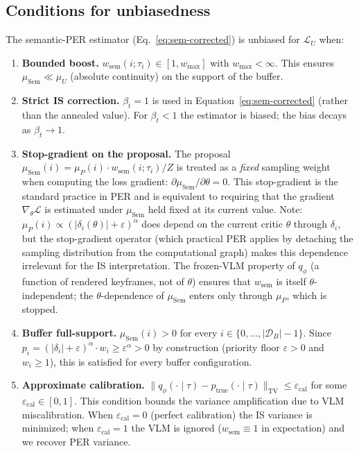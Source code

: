 \subsection{Conditions for unbiasedness}
\label{app:unbiased}

The semantic-PER estimator (Eq.~\ref{eq:sem-corrected}) is unbiased for
$\mathcal{L}_U$ when:

\begin{enumerate}\itemsep1pt
\item[(A1)] \textbf{Bounded boost.} $w_{\text{sem}}(i;\tau_i)\in[1,w_{\max}]$
with $w_{\max}<\infty$. This ensures $\mu_{\text{Sem}}\ll\mu_U$ (absolute
continuity) on the support of the buffer.
\item[(A2)] \textbf{Strict IS correction.} $\beta_t=1$ is used in
Equation~\eqref{eq:sem-corrected} (rather than the annealed value). For
$\beta_t<1$ the estimator is biased; the bias decays as $\beta_t\to 1$.
\item[(A3)] \textbf{Stop-gradient on the proposal.} The proposal
$\mu_{\text{Sem}}(i)=\mu_P(i)\cdot w_{\text{sem}}(i;\tau_i)/Z$ is
treated as a \emph{fixed} sampling weight when computing the loss gradient:
$\partial\mu_{\text{Sem}}/\partial\theta=0$. This stop-gradient
is the standard practice in PER \citep{schaul2016per} and is equivalent
to requiring that the gradient $\nabla_\theta\mathcal{L}$ is estimated
under $\mu_{\text{Sem}}$ held fixed at its current value.
Note: $\mu_P(i)\propto(|\delta_i(\theta)|+\varepsilon)^\alpha$ does depend
on the current critic $\theta$ through $\delta_i$, but the stop-gradient
operator (which practical PER applies by detaching the sampling distribution
from the computational graph) makes this dependence irrelevant for the IS
interpretation. The frozen-VLM property of $q_\phi$ (a function of rendered
keyframes, not of $\theta$) ensures that $w_{\text{sem}}$ is itself
$\theta$-independent; the $\theta$-dependence of $\mu_{\text{Sem}}$ enters
only through $\mu_P$, which is stopped.
\item[(A4)] \textbf{Buffer full-support.} $\mu_{\text{Sem}}(i)>0$ for
every $i\in\{0,\dots,|\mathcal{D}_B|-1\}$. Since $p_i=(|\delta_i|+\varepsilon)^\alpha
\cdot w_i \ge \varepsilon^\alpha>0$ by construction (priority floor $\varepsilon>0$
and $w_i\ge 1$), this is satisfied for every buffer configuration.
\item[(A5)] \textbf{Approximate calibration.}
$\|q_\phi(\cdot\!\mid\!\tau) - p_{\text{true}}(\cdot\!\mid\!\tau)\|_{\text{TV}}
\le \varepsilon_{\text{cal}}$ for some $\varepsilon_{\text{cal}}\in[0,1]$.
This condition bounds the variance amplification due to VLM miscalibration.
When $\varepsilon_{\text{cal}}=0$ (perfect calibration) the IS variance
is minimized; when $\varepsilon_{\text{cal}}=1$ the VLM is ignored
($w_{\text{sem}}\equiv 1$ in expectation) and we recover PER variance.
\end{enumerate}

